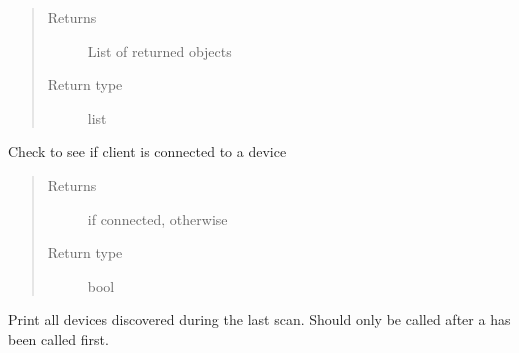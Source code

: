 \documentclass[letterpaper,10pt,english]{sphinxmanual}
\begin{document}
\begin{fulllineitems}
\begin{fulllineitems}
\begin{quote}
\begin{description}
\begin{itemize}
\end{itemize}

\item[{Returns}] \leavevmode
List of returned  objects

\item[{Return type}] \leavevmode
list

\end{description}\end{quote}

\end{fulllineitems}


\begin{fulllineitems}
\label{\detokenize{PandaBot:PandaBot.PandaBotClient.isConnected}}
Check to see if client is connected to a device
\begin{quote}\begin{description}
\item[{Returns}] \leavevmode
{} if connected,  otherwise

\item[{Return type}] \leavevmode
bool

\end{description}\end{quote}

\end{fulllineitems}


\begin{fulllineitems}
\label{\detokenize{PandaBot:PandaBot.PandaBotClient.printFoundDevices}}
Print all devices discovered during the last scan. Should only be called after a {\hyperref[\detokenize{PandaBot:PandaBot.PandaBotClient.scan}]{}} has been called first.

\end{fulllineitems}



\end{fulllineitems}
\end{document}
